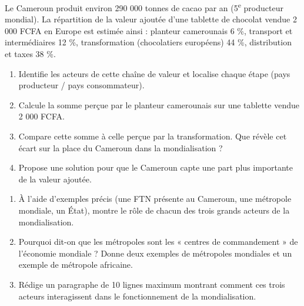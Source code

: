 \documentclass[11pt]{article}
\newcounter{popsec}
\newcounter{popsub}
\newcommand{\courssub}[1]{%
  \stepcounter{popsub}%
  \par\vspace{9pt}\noindent{\popxbold\fontsize{11.5}{13}\selectfont\color{popink}{\color{poporange}\thepopsec.\thepopsub}\hspace{6pt}#1}\par\nopagebreak\vspace{4pt}
}
\begin{document}
\begin{exercice}
Le Cameroun produit environ 290 000 tonnes de cacao par an (5\textsuperscript{e} producteur mondial). La répartition de la valeur ajoutée d'une tablette de chocolat vendue 2 000 FCFA en Europe est estimée ainsi : planteur camerounais 6 \%, transport et intermédiaires 12 \%, transformation (chocolatiers européens) 44 \%, distribution et taxes 38 \%.
\begin{enumerate}
\item Identifie les acteurs de cette chaîne de valeur et localise chaque étape (pays producteur / pays consommateur).
\item Calcule la somme perçue par le planteur camerounais sur une tablette vendue 2 000 FCFA.
\item Compare cette somme à celle perçue par la transformation. Que révèle cet écart sur la place du Cameroun dans la mondialisation ?
\item Propose une solution pour que le Cameroun capte une part plus importante de la valeur ajoutée.
\end{enumerate}
\end{exercice}

\begin{exercice}
\begin{enumerate}
\item À l'aide d'exemples précis (une FTN présente au Cameroun, une métropole mondiale, un État), montre le rôle de chacun des trois grands acteurs de la mondialisation.
\item Pourquoi dit-on que les métropoles sont les « centres de commandement » de l'économie mondiale ? Donne deux exemples de métropoles mondiales et un exemple de métropole africaine.
\item Rédige un paragraphe de 10 lignes maximum montrant comment ces trois acteurs interagissent dans le fonctionnement de la mondialisation.
\end{enumerate}
\end{exercice}

\courssub{Je me prépare au Bac}
\end{document}
